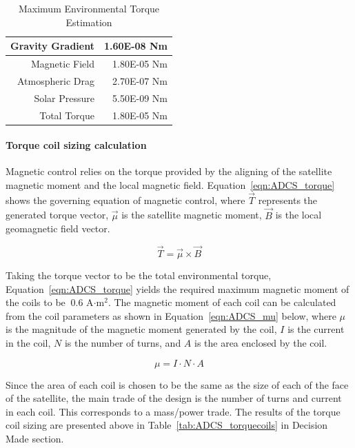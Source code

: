 \documentclass[12pt]{article}
\begin{document}
\begin{table}[htbp!]
  \centering
  \caption{Maximum Environmental Torque Estimation}
    \begin{tabular}{|r|r|}
    \hline
    Gravity Gradient & 1.60E-08 Nm \bigstrut\\
    \hline
    Magnetic Field & 1.80E-05 Nm \bigstrut\\
    \hline
    Atmospheric Drag & 2.70E-07 Nm \bigstrut\\
    \hline
    Solar Pressure & 5.50E-09 Nm \bigstrut\\
    \hline
    Total Torque & 1.80E-05 Nm \bigstrut\\
    \hline
    \end{tabular}%
  \label{tab:ADCS_envtorque}%
\end{table}%

			\paragraph{Torque coil sizing calculation}
			Magnetic control relies on the torque provided by the aligning of the satellite magnetic moment and the local magnetic field. Equation~\ref{eqn:ADCS_torque} shows the governing equation of magnetic control, where $\vec{T}$ represents the generated torque vector, $\vec{\mu}$ is the satellite magnetic moment, $\vec{B}$ is the local geomagnetic field vector. 

			\begin{equation}
				\vec{T} = \vec{\mu} \times \vec{B}
				\label{eqn:ADCS_torque}
			\end{equation}

			Taking the torque vector to be the total environmental torque, Equation~\ref{eqn:ADCS_torque} yields the required maximum magnetic moment of the coils to be $~ 0.6$ A$\cdot$m$^2$. The magnetic moment of each coil can be calculated from the coil parameters as shown in Equation~\ref{eqn:ADCS_mu} below, where $\mu$ is the magnitude of the magnetic moment generated by the coil, $I$ is the current in the coil, $N$ is the number of turns, and $A$ is the area enclosed by the coil. 

			\begin{equation}
				\mu = I \cdot N \cdot A
				\label{eqn:ADCS_mu}
			\end{equation}

			Since the area of each coil is chosen to be the same as the size of each of the face of the satellite, the main trade of the design is the number of turns and current in each coil. This corresponds to a mass/power trade. The results of the torque coil sizing are presented above in Table~\ref{tab:ADCS_torquecoils} in Decision Made section. 
\end{document}
